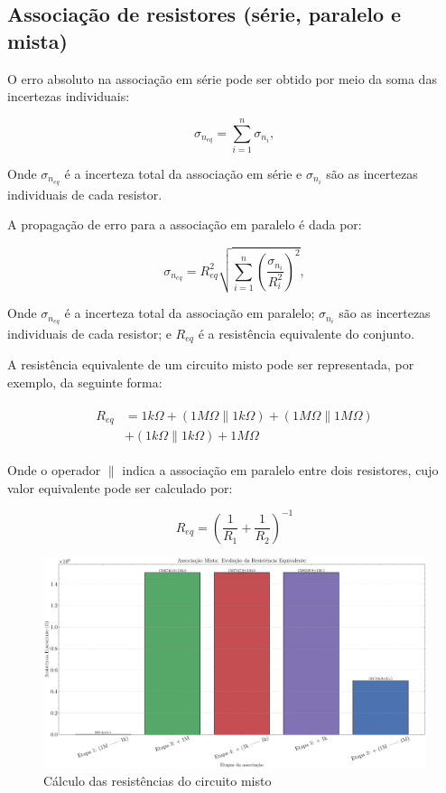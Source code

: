 \documentclass[conference]{IEEEtran}
\begin{document}
\subsection{Associação de resistores (série, paralelo e mista)}

O erro absoluto na associação em série pode ser obtido por meio da soma das incertezas individuais:

\begin{equation}
    \sigma_{n_{eq}} = \sum_{i=1}^{n} \sigma_{n_i},
\end{equation}

\noindent
Onde $\sigma_{n_{eq}}$ é a incerteza total da associação em série e $\sigma_{n_i}$ são as incertezas individuais de cada resistor.

A propagação de erro para a associação em paralelo é dada por:

\begin{equation}
    \sigma_{n_{eq}} = R_{eq}^2 \sqrt{\sum_{i=1}^{n} \left(\frac{\sigma_{n_i}}{R_i^2}\right)^2},
\end{equation}

\noindent
Onde \(\sigma_{n_{eq}}\) é a incerteza total da associação em paralelo; \(\sigma_{n_i}\) são as incertezas individuais de cada resistor; e \(R_{eq}\) é a resistência equivalente do conjunto.

A resistência equivalente de um circuito misto pode ser representada, por exemplo, da seguinte forma:

\begin{align*}
    \begin{split}
        R_{eq} & = 1k\Omega + \left(1M\Omega \parallel 1k\Omega\right) + \left(1M\Omega \parallel 1M\Omega\right) \\
               & + \left(1k\Omega \parallel 1k\Omega\right) + 1M\Omega
    \end{split}
\end{align*}

\noindent
Onde o operador $\parallel$ indica a associação em paralelo entre dois resistores, cujo valor equivalente pode ser calculado por:

\begin{equation}
    R_{eq} = \left( \frac{1}{R_1} + \frac{1}{R_2} \right)^{-1}
\end{equation}

\begin{figure}[htbp]
    \centering
    \caption{Cálculo das resistências do circuito misto}
    \label{fig:plot_assoc_mista}
    \includegraphics[width=0.8\linewidth]{figures/plot_assoc_mista.pdf}
\end{figure}
\end{document}
